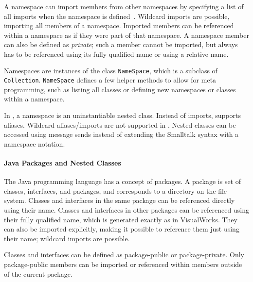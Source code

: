 A namespace can import members from other namespaces by specifying a list of all imports when the namespace is defined~\cite{cincomst}. Wildcard imports are possible, importing all members of a namespace. Imported members can be referenced within a namespace as if they were part of that namespace. A namespace member can also be defined as \emph{private}; such a member cannot be imported, but always has to be referenced using its fully qualified name or using a relative name.

Namespaces are instances of the class \texttt{NameSpace}, which is a subclass of \texttt{Collection}. \texttt{NameSpace} defines a few helper methods to allow for meta programming, such as listing all classes or defining new namespaces or classes within a namespace.

In \msname, a namespace is an uninstantiable nested class. Instead of imports, \msname supports aliases. Wildcard aliases/imports are not supported in \msname. Nested classes can be accessed using message sends instead of extending the Smalltalk syntax with a namespace notation.

\paragraph{Java Packages and Nested Classes}
The Java programming language has a concept of packages. A package is set of classes, interfaces, and packages, and corresponds to a directory on the file system. Classes and interfaces in the same package can be referenced directly using their name. Classes and interfaces in other packages can be referenced using their fully qualified name, which is generated exactly as in VisualWorks. They can also be imported explicitly, making it possible to reference them just using their name; wildcard imports are possible.

Classes and interfaces can be defined as package-public or package-private. Only package-public members can be imported or referenced within members outside of the current package.

